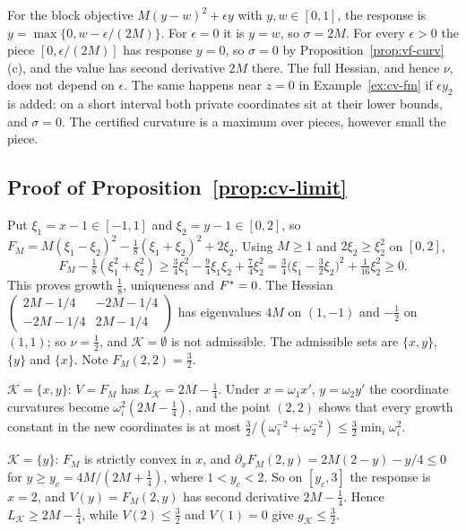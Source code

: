\begin{remark}\label{rem:cv-unstable}
For the block objective $M(y-w)^2+\epsilon y$ with $y,w\in[0,1]$, the
response is $y=\max\{0,w-\epsilon/(2M)\}$. For $\epsilon=0$ it is $y=w$, so
$\sigma=2M$. For every $\epsilon>0$ the piece $[0,\epsilon/(2M)]$ has
response $y=0$, so $\sigma=0$ by Proposition~\ref{prop:vf-curv}(c), and the
value has second derivative $2M$ there. The full Hessian, and hence $\nu$,
does not depend on $\epsilon$. The same happens near $z=0$ in
Example~\ref{ex:cv-fm} if $\epsilon y_2$ is added: on a short interval both
private coordinates sit at their lower bounds, and $\sigma=0$. The certified
curvature is a maximum over pieces, however small the piece.
\end{remark}

\subsection{Proof of Proposition~\ref{prop:cv-limit}}

Put $\xi_1=x-1\in[-1,1]$ and $\xi_2=y-1\in[0,2]$, so
$F_M=M(\xi_1-\xi_2)^2-\frac18(\xi_1+\xi_2)^2+2\xi_2$. Using $M\ge1$ and
$2\xi_2\ge\xi_2^2$ on $[0,2]$,
\[
F_M-\tfrac18(\xi_1^2+\xi_2^2)\ge\tfrac34\xi_1^2-\tfrac94\xi_1\xi_2+\tfrac74\xi_2^2
=\tfrac34\bigl(\xi_1-\tfrac32\xi_2\bigr)^2+\tfrac1{16}\xi_2^2\ge0.
\]
This proves growth $\frac18$, uniqueness and $F^{*}=0$. The Hessian
$\left(\begin{smallmatrix}2M-1/4&-2M-1/4\\-2M-1/4&2M-1/4\end{smallmatrix}\right)$
has eigenvalues $4M$ on $(1,-1)$ and $-\frac12$ on $(1,1)$; so $\nu=\frac12$,
and $\mathcal K=\emptyset$ is not admissible. The admissible sets are
$\{x,y\}$, $\{y\}$ and $\{x\}$. Note $F_M(2,2)=\frac32$.

$\mathcal K=\{x,y\}$: $V=F_M$ has $L_{\mathcal K}=2M-\frac14$. Under
$x=\omega_1x'$, $y=\omega_2y'$ the coordinate curvatures become
$\omega_i^2(2M-\frac14)$, and the point $(2,2)$ shows that every growth
constant in the new coordinates is at most
$\frac32/(\omega_1^{-2}+\omega_2^{-2})\le\frac32\min_i\omega_i^2$.

$\mathcal K=\{y\}$: $F_M$ is strictly convex in $x$, and
$\partial_xF_M(2,y)=2M(2-y)-y/4\le0$ for $y\ge y_c=4M/(2M+\frac14)$, where
$1<y_c<2$. So on $[y_c,3]$ the response is $x=2$, and $V(y)=F_M(2,y)$ has
second derivative $2M-\frac14$. Hence $L_{\mathcal K}\ge2M-\frac14$, while
$V(2)\le\frac32$ and $V(1)=0$ give $g_{\mathcal K}\le\frac32$.

